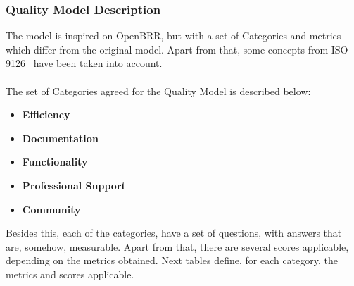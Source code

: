 \documentclass[11pt]{article}
\begin{document}
\subsubsection{Quality Model Description}
The model is inspired on OpenBRR, but with a set of Categories and metrics which differ from the original model. Apart from that, some concepts from ISO 9126~\cite{ISO00, ISO01} have been taken into account.\\
\\
The set of Categories agreed for the Quality Model is described below:
\begin{itemize}\itemsep0pt
\item{\textbf{Efficiency}}
\item{\textbf{Documentation}}
\item{\textbf{Functionality}}
\item{\textbf{Professional Support}}
\item{\textbf{Community}}
\end{itemize}

Besides this, each of the categories, have a set of questions, with answers that are, somehow, measurable. Apart from that, there are several scores applicable, depending on the metrics obtained. Next tables define, for each category, the metrics and scores applicable.
\end{document}
